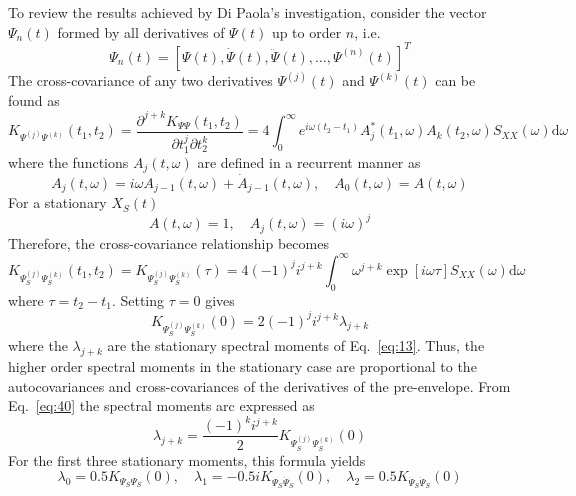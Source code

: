 \documentclass{article}
\begin{document}
To review the results achieved by Di Paola's investigation, consider the
vector $\Psi_n (t)$ formed by all derivatives of $\Psi (t)$ up to order $n$,
i.e.
\begin{equation}
  \Psi_n (t) = [\Psi (t), \dot{\Psi} (t), \ddot{\Psi} (t), \ldots, \Psi^{(n)}
  (t)]^T \label{eq:35}
\end{equation}
The cross-covariance of any two derivatives $\Psi^{(j)} (t)$ and $\Psi^{(k)}
(t)$ can be found as
\begin{equation}
  K_{\Psi^{(j)} \Psi^{(k)}} (t_1, t_2) = \frac{\partial^{j + k} K_{\Psi \Psi}
  (t_1, t_2)}{\partial t_1^j \partial t_2^k} = 4 \int_0^{\infty} e^{i \omega
  (t_2 - t_1)} A_j^{\ast} (t_1, \omega) A_k (t_2, \omega) S_{XX} (\omega)
  \mathrm{d} \omega \label{eq:36}
\end{equation}
where the functions $A_j (t, \omega)$ are defined in a recurrent manner as
\begin{equation}
  A_j (t, \omega) = i \omega A_{j - 1} (t, \omega) + \dot{A}_{j - 1} (t,
  \omega), \quad A_0 (t, \omega) = A (t, \omega) \label{eq:37}
\end{equation}
For a stationary $X_S (t)$
\begin{equation}
  A (t, \omega) = 1, \quad A_j (t, \omega) = (i \omega)^j \label{eq:38}
\end{equation}
Therefore, the cross-covariance relationship becomes
\begin{equation}
  K_{\Psi_S^{(j)} \Psi_S^{(k)}} (t_1, t_2) = K_{\Psi_S^{(j)} \Psi_S^{(k)}}
  (\tau) = 4 (- 1)^j i^{j + k}  \int_0^{\infty} \omega^{j + k} \exp [i \omega
  \tau] S_{XX} (\omega) \mathrm{d} \omega \label{eq:39}
\end{equation}
where $\tau = t_2 - t_1$. Setting $\tau = 0$ gives
\begin{equation}
  K_{\Psi_S^{(j)} \Psi_S^{(k)}} (0) = 2 (- 1)^j i^{j + k} \lambda_{j + k}
  \label{eq:40}
\end{equation}
where the $\lambda_{j + k}$ are the stationary spectral moments of
Eq.~\eqref{eq:13}. Thus, the higher order spectral moments in the stationary
case are proportional to the autocovariances and cross-covariances of the
derivatives of the pre-envelope. From Eq.~\eqref{eq:40} the spectral moments
arc expressed as
\begin{equation}
  \lambda_{j + k} = \frac{(- 1)^k i^{j + k}}{2} K_{\Psi_S^{(j)} \Psi_S^{(k)}}
  (0) \label{eq:41}
\end{equation}
For the first three stationary moments, this formula yields
\begin{equation}
  \lambda_0 = 0.5 K_{\Psi_S \Psi_S} (0), \quad \lambda_1 = - 0.5 iK_{\Psi_S 
  \dot{\Psi}_S} (0), \quad \lambda_2 = 0.5 K_{\dot{\Psi}_S  \dot{\Psi}_S} (0)
  \label{eq:42}
\end{equation}
\end{document}
